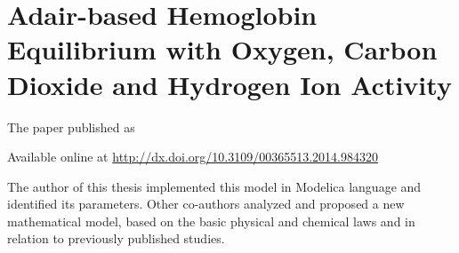 \chapter{Adair-based Hemoglobin Equilibrium with Oxygen, Carbon Dioxide and Hydrogen Ion Activity}\label{app:adair}
The paper \cite{Matejak2014sj} published as
 

Available online at \url{http://dx.doi.org/10.3109/00365513.2014.984320}

The author of this thesis implemented this model in Modelica language and identified its parameters. Other co-authors analyzed and proposed a new mathematical model, based on the basic physical and chemical laws and in relation to previously published studies.


